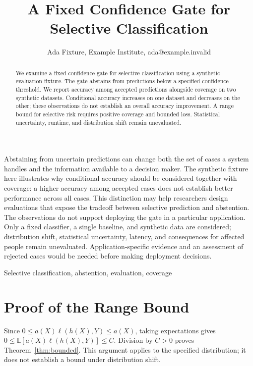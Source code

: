 \documentclass[journal]{IEEEtai}
\title{A Fixed Confidence Gate for Selective Classification}
\author{Ada Fixture, Example Institute, ada@example.invalid}
\begin{document}
\maketitle
\begin{abstract}
We examine a fixed confidence gate for selective classification using a synthetic
evaluation fixture. The gate abstains from predictions below a specified confidence
threshold. We report accuracy among accepted predictions alongside coverage on two
synthetic datasets. Conditional accuracy increases on one dataset and decreases on
the other; these observations do not establish an overall accuracy improvement.
A range bound for selective risk requires positive coverage and bounded loss.
Statistical uncertainty, runtime, and distribution shift remain unevaluated.
\end{abstract}
\begin{IEEEImpStatement}
Abstaining from uncertain predictions can change both the set of cases a system
handles and the information available to a decision maker. The synthetic fixture
here illustrates why conditional accuracy should be considered together with
coverage: a higher accuracy among accepted cases does not establish better
performance across all cases. This distinction may help researchers design
evaluations that expose the tradeoff between selective prediction and abstention.
The observations do not support deploying the gate in a particular application.
Only a fixed classifier, a single baseline, and synthetic data are considered;
distribution shift, statistical uncertainty, latency, and consequences for affected
people remain unevaluated. Application-specific evidence and an assessment of
rejected cases would be needed before making deployment decisions.
\end{IEEEImpStatement}
\begin{IEEEkeywords}Selective classification, abstention, evaluation, coverage\end{IEEEkeywords}


\appendix
\section{Proof of the Range Bound}\label{app:proof}
Since $0\leq a(X)\ell(h(X),Y)\leq a(X)$, taking expectations gives
$0\leq\mathbb{E}[a(X)\ell(h(X),Y)]\leq C$. Division by $C>0$ proves
Theorem~\ref{thm:bounded}. This argument applies to the specified distribution;
it does not establish a bound under distribution shift.
\end{document}
